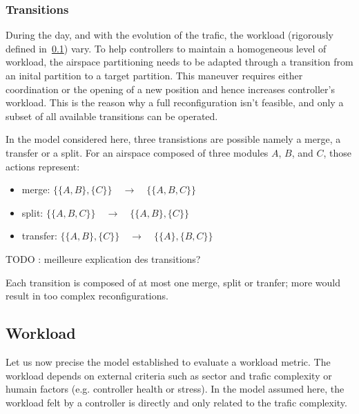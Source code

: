 \documentclass[oneside,twocolumn]{article}
\begin{document}
\subsubsection{Transitions}\label{sssec:transitions}

During the day, and with the evolution of the trafic, the workload (rigorously
defined in~\ref{sub:workload}) vary. To help controllers to maintain a
homogeneous level of workload, the airspace partitioning needs to be adapted
through a transition from an inital partition to a target partition.
This maneuver requires either coordination or the opening of a new position
and hence increases controller's workload.
This is the reason why a full reconfiguration isn't feasible, and
only a subset of all available transitions can be operated.

In the model considered here, three transistions are possible namely a merge,
a transfer
or a split. For an airspace composed of three modules $A$, $B$, and $C$,
those actions represent:
\begin{itemize}
  \item merge: $\{\{A, B\}, \{C\}\} \quad \rightarrow \quad \{\{A, B, C\}\}$
  \item split: $\{\{A, B, C\}\} \quad \rightarrow \quad \{\{A, B\}, \{C\}\}$
  \item transfer: $\{\{A, B\}, \{C\}\} \quad \rightarrow \quad \{\{A\}, \{B, C\}\}$
\end{itemize}

TODO : meilleure explication des transitions?

Each transition is composed of at most one merge, split or tranfer; more would
result in too complex reconfigurations.

\subsection{Workload}\label{sub:workload}

Let us now precise the model established to evaluate a workload metric. The
workload depends on external criteria such as sector and trafic complexity
or humain factors (e.g. controller health or stress). In the model assumed here,
the workload felt by a controller is directly and only related to the trafic
complexity.
\end{document}
